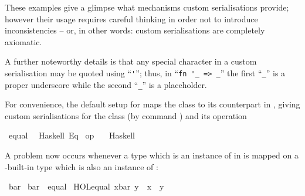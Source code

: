 \begin{isabellebody}
\begin{isamarkuptext}
  These examples give a glimpse what mechanisms custom serialisations
  provide; however their usage requires careful thinking in order not
  to introduce inconsistencies -- or, in other words: custom
  serialisations are completely axiomatic.

  A further noteworthy details is that any special character in a
  custom serialisation may be quoted using ``\verb|'|''; thus,
  in ``\verb|fn '_ => _|'' the first ``\verb|_|'' is a
  proper underscore while the second ``\verb|_|'' is a
  placeholder.%
\end{isamarkuptext}%
\isamarkuptrue%
%
\isamarkuptrue%
%
\begin{isamarkuptext}%
For convenience, the default  setup for 
  maps the  class to its counterpart in ,
  giving custom serialisations for the class  (by command
  \hypertarget{command.code-class}{\hyperlink{command.code-class}{\mbox{}}}) and its operation %
\end{isamarkuptext}%
\isamarkuptrue%
%
\isadelimquotett
%
\endisadelimquotett
%
\isatagquotett
{}\isamarkupfalse%
\ equal\isanewline
\ \ {\isacharparenleft}Haskell\ {\isachardoublequoteopen}Eq{\isachardoublequoteclose}{\isacharparenright}\isanewline
\isanewline
{}\isamarkupfalse%
\ {\isachardoublequoteopen}op\ {\isacharequal}{\isachardoublequoteclose}\isanewline
\ \ {\isacharparenleft}Haskell\ \ {}\ {\isachardoublequoteopen}{\isacharequal}{\isacharequal}{\isachardoublequoteclose}{\isacharparenright}%
\endisatagquotett
{\isafoldquotett}%
%
\isadelimquotett
%
\endisadelimquotett
%
\begin{isamarkuptext}%
\noindent A problem now occurs whenever a type which is an instance
  of  in  is mapped on a -built-in type which is also an instance of 
  :%
\end{isamarkuptext}%
\isamarkuptrue%
%
\isadelimquote
%
\endisadelimquote
%
\isatagquote
{}\isamarkupfalse%
\ bar\isanewline
\isanewline
{}\isamarkupfalse%
\ bar\ {\isacharcolon}{\isacharcolon}\ equal\isanewline
{}\isanewline
\isanewline
{}\isamarkupfalse%
\ {\isachardoublequoteopen}HOL{\isachardot}equal\ {\isacharparenleft}x{\isasymColon}bar{\isacharparenright}\ y\ {\isasymlongleftrightarrow}\ x\ {\isacharequal}\ y{\isachardoublequoteclose}\isanewline

\end{isabellebody}
